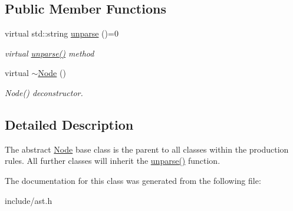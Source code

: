 \subsection*{Public Member Functions}
\begin{DoxyCompactItemize}
\item 
virtual std\+::string \hyperlink{classfcal_1_1ast_1_1Node_a81865f5a1df593708a39bf492952742a}{unparse} ()=0\hypertarget{classfcal_1_1ast_1_1Node_a81865f5a1df593708a39bf492952742a}{}\label{classfcal_1_1ast_1_1Node_a81865f5a1df593708a39bf492952742a}

\begin{DoxyCompactList}\small\item\em virtual \hyperlink{classfcal_1_1ast_1_1Node_a81865f5a1df593708a39bf492952742a}{unparse()} method \end{DoxyCompactList}\item 
virtual \hyperlink{classfcal_1_1ast_1_1Node_a9bc0227b31ced4b51daff34828210639}{$\sim$\+Node} ()\hypertarget{classfcal_1_1ast_1_1Node_a9bc0227b31ced4b51daff34828210639}{}\label{classfcal_1_1ast_1_1Node_a9bc0227b31ced4b51daff34828210639}

\begin{DoxyCompactList}\small\item\em Node() deconstructor. \end{DoxyCompactList}\end{DoxyCompactItemize}


\subsection{Detailed Description}
The abstract \hyperlink{classfcal_1_1ast_1_1Node}{Node} base class is the parent to all classes within the production rules. All further classes will inherit the \hyperlink{classfcal_1_1ast_1_1Node_a81865f5a1df593708a39bf492952742a}{unparse()} function. 

The documentation for this class was generated from the following file\+:\begin{DoxyCompactItemize}
\item 
include/ast.\+h\end{DoxyCompactItemize}
